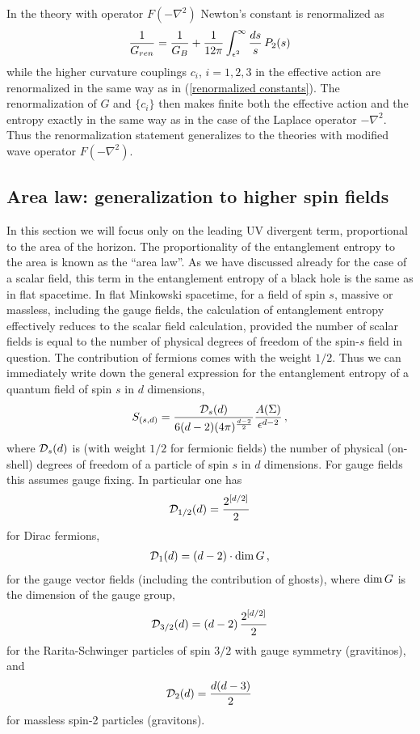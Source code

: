 \documentclass[12pt]{article}
\def\be{\begin{eqnarray}}
\def\ee{\end{eqnarray}}
\def\lb{\label}
\def\o{\over}
\begin{document}
In the theory with operator $F(-\nabla^2)$  Newton's constant is renormalized as \cite{Nesterov:2010yi}
\be
{1\o G_{ren}}={1\o G_B}+{1\o 12\pi}\int_{\epsilon^2}^\infty {ds\o s}\, P_2(s)
\lb{renormalization modified}
\ee
while the higher curvature couplings $c_i$, $i=1,2,3$ in the effective action are renormalized in the same way as in (\ref{renormalized constants}).
The renormalization of $G$ and $\{c_i\}$  then makes finite both  the effective action and the entropy exactly in the same way as in the case of the Laplace operator $-\nabla^2$.
Thus the renormalization statement generalizes to the theories with modified wave operator $F(-\nabla^2)$.

\subsection{Area law: generalization to  higher spin fields }
In this section we will focus only on the leading UV divergent term, proportional to the area of the horizon. The proportionality of the entanglement entropy to the area is known as  the  ``area law''.
As we have discussed already for the case of a  scalar field,  this term in the entanglement entropy of a black hole is the same as in flat spacetime.
In flat Minkowski spacetime, for a field of spin $s$, massive or massless, including the gauge fields,  
the calculation of entanglement entropy effectively reduces to the scalar field calculation, provided the number of  scalar fields is equal to the number of physical degrees of freedom of the spin-$s$ field in question. The contribution of fermions comes with the weight $1/2$. 
Thus we can immediately write down  the general expression for the entanglement entropy of a quantum field of spin $s$ in $d$ dimensions,
\be
S_{(s,d)}={{\cal D}_s(d)\over 6(d-2)(4\pi)^{d-2\o 2}}{A(\Sigma)\over \epsilon^{d-2}}\, ,
\lb{entropy-arbitrary spin}
\ee
where ${\cal D}_s(d)$ is (with weight $1/2$ for fermionic fields) the number of physical (on-shell) degrees of freedom of a particle of 
spin $s$ in $d$ dimensions. 
For gauge fields this assumes gauge fixing.
In particular one has
\be
{\cal D}_{1/2}(d)={2^{[d/2]}\o 2}
\lb{spinors}
\ee
for Dirac fermions,
\be
{\cal D}_1(d)=(d-2)\cdot {\rm dim}\,  G\, ,
\lb{vectors}
\ee
for the  gauge vector fields (including the contribution of ghosts), where ${\rm dim} \, G$ is the dimension of the gauge group,
\be
{\cal D}_{3/2}(d)=(d-2)\, {2^{[d/2]}\o 2}
\lb{gravitino}
\ee
for the Rarita-Schwinger particles of spin $3/2$ with gauge symmetry (gravitinos), and 
\be
{\cal D}_2(d)={d(d-3)\over 2}\, 
\lb{graviton}
\ee
for massless spin-2 particles (gravitons).
\end{document}
